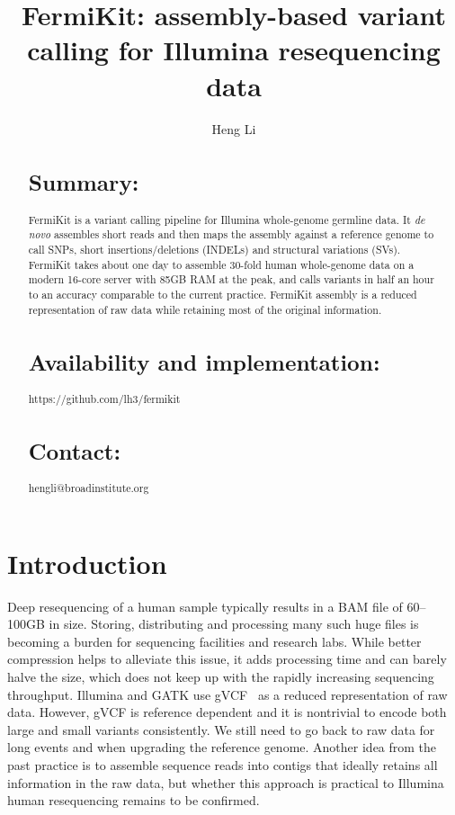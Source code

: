 \documentclass{bioinfo}
\begin{document}

\title[FermiKit: assembly based variant calling]{FermiKit: assembly-based variant calling for Illumina resequencing data}

\author[Li]{Heng Li}

\address{Broad Institute, 75 Ames Street, Cambridge, MA 02142, USA}

\maketitle

\begin{abstract}
\section{Summary:}
FermiKit is a variant calling pipeline for Illumina whole-genome germline data. It {\it de novo}
assembles short reads and then maps the assembly against a reference genome to
call SNPs, short insertions/deletions (INDELs) and structural variations (SVs).
FermiKit takes about one day to assemble 30-fold human whole-genome data on a
modern 16-core server with 85GB RAM at the peak, and calls variants in half an hour to
an accuracy comparable to the current practice. FermiKit assembly is a reduced
representation of raw data while retaining most of the original information.

\section{Availability and implementation:} https://github.com/lh3/fermikit

\section{Contact:} hengli@broadinstitute.org
\end{abstract}

\section{Introduction}
Deep resequencing of a human sample typically results in a BAM file of
60--100GB in size. Storing, distributing and processing many such huge files
is becoming a burden for sequencing facilities and research labs. While better
compression helps to alleviate this issue, it adds processing time and can
barely halve the size, which does not keep up with the rapidly increasing
sequencing throughput. Illumina and GATK use gVCF~\citep{Raczy:2013aa} as a
reduced representation of raw data. However, gVCF is reference dependent and it
is nontrivial to encode both large and small variants consistently. We still
need to go back to raw data for long events and when upgrading the reference
genome. Another idea from the past practice is to assemble sequence reads into
contigs that ideally retains all information in the raw data, but whether this
approach is practical to Illumina human resequencing remains to be confirmed.
\end{document}

